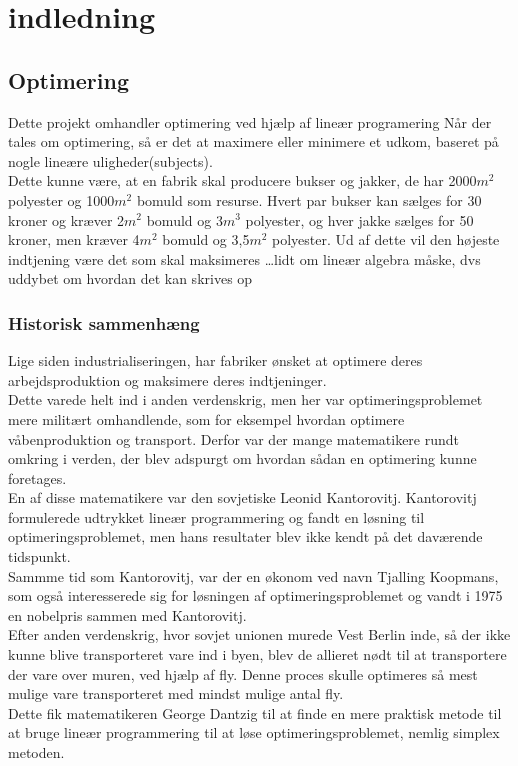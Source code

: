 \chapter{indledning}
\section{Optimering}
Dette projekt omhandler optimering ved hjælp af lineær programering %
Når der tales om optimering, så er det at maximere eller minimere et udkom, baseret på nogle lineære uligheder(subjects). \\
Dette kunne være, at en fabrik skal producere bukser og jakker, de har 2000$m^2$ polyester og 100$0m^2$ bomuld som resurse.
Hvert par bukser kan sælges for 30 kroner og kræver 2$m^2$ bomuld og 3$m^3$ polyester, og hver jakke sælges for 50 kroner, men kræver 4$m^2$ bomuld og 3,5$m^2$ polyester. Ud af dette vil den højeste indtjening være det som skal maksimeres …lidt om lineær algebra måske, dvs uddybet om hvordan det kan skrives op \\
\subsection{Historisk sammenhæng}
Lige siden industrialiseringen, har fabriker ønsket at optimere deres arbejdsproduktion og maksimere deres indtjeninger. \\ %
Dette varede helt ind i anden verdenskrig, men her var optimeringsproblemet mere militært omhandlende, som for eksempel hvordan optimere våbenproduktion og transport. Derfor var der mange matematikere rundt omkring i verden, der blev adspurgt om hvordan sådan en optimering kunne foretages. \\
En af disse matematikere var den sovjetiske Leonid Kantorovitj. Kantorovitj formulerede udtrykket lineær programmering og fandt en løsning til optimeringsproblemet, men hans resultater blev ikke kendt på det daværende tidspunkt. \\
Sammme tid som Kantorovitj, var der en økonom ved navn Tjalling Koopmans, som også interesserede sig for løsningen af optimeringsproblemet og vandt i 1975 en nobelpris sammen med Kantorovitj.\\

Efter anden verdenskrig, hvor sovjet unionen murede Vest Berlin inde, så der ikke kunne blive transporteret vare ind i byen, blev de allieret nødt til at transportere der vare over muren, ved hjælp af fly. Denne proces skulle optimeres så mest mulige vare transporteret med mindst mulige antal fly. \\
Dette fik matematikeren George Dantzig til at finde en mere praktisk metode til at bruge lineær programmering til at løse optimeringsproblemet, nemlig simplex metoden. %